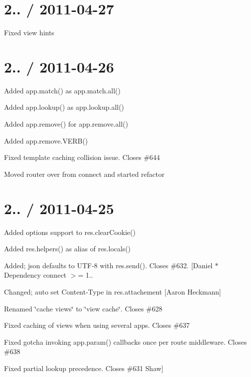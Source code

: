 \section*{2.. / 2011-\/04-\/27 }


\begin{DoxyItemize}
\item Fixed view hints
\end{DoxyItemize}

\section*{2.. / 2011-\/04-\/26 }


\begin{DoxyItemize}
\item Added {\ttfamily app.\+match()} as {\ttfamily app.\+match.\+all()}
\item Added {\ttfamily app.\+lookup()} as {\ttfamily app.\+lookup.\+all()}
\item Added {\ttfamily app.\+remove()} for {\ttfamily app.\+remove.\+all()}
\item Added {\ttfamily app.\+remove.\+V\+E\+R\+B()}
\item Fixed template caching collision issue. Closes \#644
\item Moved router over from connect and started refactor
\end{DoxyItemize}

\section*{2.. / 2011-\/04-\/25 }


\begin{DoxyItemize}
\item Added options support to {\ttfamily res.\+clear\+Cookie()}
\item Added {\ttfamily res.\+helpers()} as alias of {\ttfamily res.\+locals()}
\item Added; json defaults to U\+T\+F-\/8 with {\ttfamily res.\+send()}. Closes \#632. \mbox{[}Daniel $\ast$ Dependency {\ttfamily connect $>$= 1..}
\item Changed; auto set Content-\/\+Type in res.\+attachement \mbox{[}Aaron Heckmann\mbox{]}
\item Renamed \char`\"{}cache views\char`\"{} to \char`\"{}view cache\char`\"{}. Closes \#628
\item Fixed caching of views when using several apps. Closes \#637
\item Fixed gotcha invoking {\ttfamily app.\+param()} callbacks once per route middleware. Closes \#638
\item Fixed partial lookup precedence. Closes \#631 Shaw\mbox{]}
\end{DoxyItemize}

